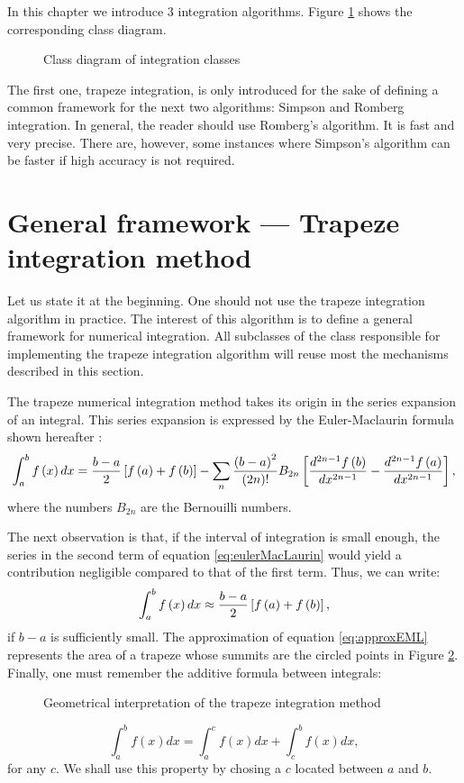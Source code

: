\documentclass[twoside]{book}
\begin{document}
In this chapter we introduce 3 integration algorithms. Figure
\ref{fig:integclass} shows the corresponding class diagram.
\begin{figure}
\center{} \caption{Class diagram of integration
classes}\label{fig:integclass}
\end{figure}
The first one, trapeze integration, is only introduced for the
sake of defining a common framework for the next two algorithms:
Simpson and Romberg integration. In general, the reader should use
Romberg's algorithm. It is fast and very precise. There are,
however, some instances where Simpson's algorithm can be faster if
high accuracy is not required.

\section{General framework --- Trapeze integration method}
\label{sec:trapeze} Let us state it at the beginning. One should
not use the trapeze integration algorithm in practice. The
interest of this algorithm is to define a general framework for
numerical integration. All subclasses of the class responsible for
implementing the trapeze integration algorithm will reuse most the
mechanisms described in this section.

The trapeze numerical integration method takes its origin in the
series expansion of an integral. This series expansion is
expressed by the Euler-Maclaurin formula shown hereafter
\cite{Bass}:
\begin{equation}
\label{eq:eulerMacLaurin}
  \int_a^b f\left(x\right)dx={b-a\over
  2}\left[f\left(a\right)+f\left(b\right)\right]-\sum_n{\left(b-a\right)^2\over
  \left(2n\right)!}B_{2n}\left[{d^{2n-1}f\left(b\right)\over dx^{2n-1}}-{d^{2n-1}f\left(a\right)\over
  dx^{2n-1}}\right],
\end{equation}
where the numbers $B_{2n}$ are the Bernouilli numbers.

The next observation is that, if the interval of integration is
small enough, the series in the second term of equation
\ref{eq:eulerMacLaurin} would yield a contribution negligible
compared to that of the first term. Thus, we can write:
\begin{equation}
\label{eq:approxEML}
  \int_a^b f\left(x\right)dx\approx{b-a\over
  2}\left[f\left(a\right)+f\left(b\right)\right],
\end{equation}
if $b-a$ is sufficiently small. The approximation of equation
\ref{eq:approxEML} represents the area of a trapeze whose summits
are the circled points in Figure \ref{fig:trapeze}. Finally, one
must remember the additive formula between integrals:
\begin{figure}
\center{}
\caption{Geometrical interpretation of the trapeze integration
method}\label{fig:trapeze}
\end{figure}
\begin{equation}
\label{eq:addintegral}
  \int_a^b f\left(x\right)dx=\int_a^c f\left(x\right)dx+\int_c^b f\left(x\right)dx,
\end{equation}
for any $c$. We shall use this property by chosing a $c$ located
between $a$ and $b$.
\end{document}
